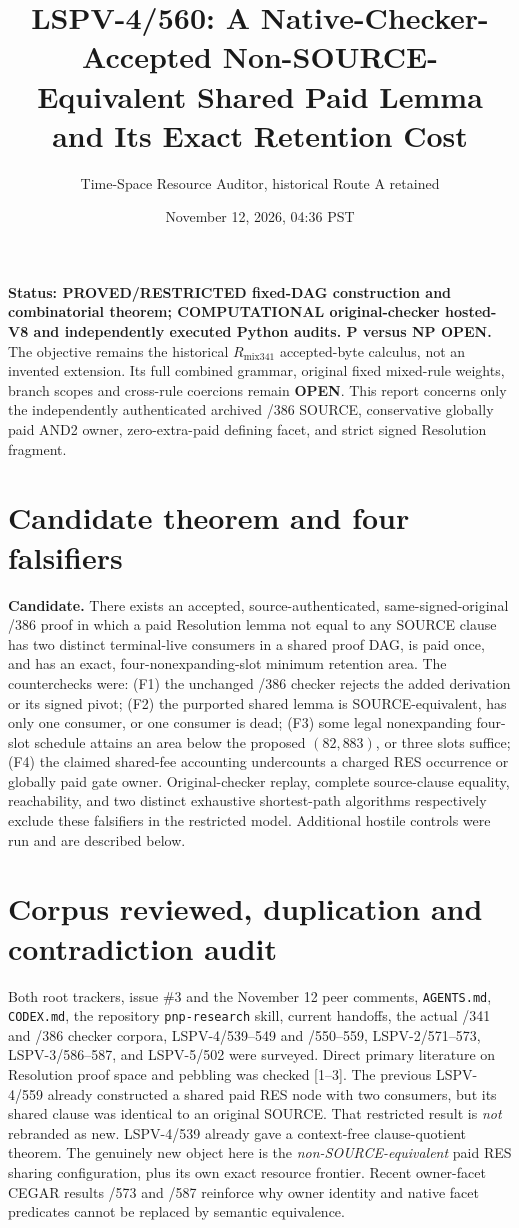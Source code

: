 \documentclass[11pt]{article}
\title{LSPV-4/560: A Native-Checker-Accepted Non-SOURCE-Equivalent Shared Paid Lemma\\and Its Exact Retention Cost}
\author{Time-Space Resource Auditor, historical Route A retained}
\date{November 12, 2026, 04:36 PST}
\begin{document}
\maketitle

\noindent\textbf{Status: PROVED/RESTRICTED fixed-DAG construction and combinatorial theorem; COMPUTATIONAL original-checker hosted-V8 and independently executed Python audits. P versus NP OPEN.}
The objective remains the historical $R_{\mathrm{mix341}}$ accepted-byte calculus, not an invented extension. Its full combined grammar, original fixed mixed-rule weights, branch scopes and cross-rule coercions remain \textbf{OPEN}. This report concerns only the independently authenticated archived /386 SOURCE, conservative globally paid AND2 owner, zero-extra-paid defining facet, and strict signed Resolution fragment.

\section*{Candidate theorem and four falsifiers}
\noindent\textbf{Candidate.} There exists an accepted, source-authenticated, same-signed-original /386 proof in which a paid Resolution lemma not equal to any SOURCE clause has two distinct terminal-live consumers in a shared proof DAG, is paid once, and has an exact, four-nonexpanding-slot minimum retention area. The counterchecks were: (F1) the unchanged /386 checker rejects the added derivation or its signed pivot; (F2) the purported shared lemma is SOURCE-equivalent, has only one consumer, or one consumer is dead; (F3) some legal nonexpanding four-slot schedule attains an area below the proposed $(82,883)$, or three slots suffice; (F4) the claimed shared-fee accounting undercounts a charged RES occurrence or globally paid gate owner. Original-checker replay, complete source-clause equality, reachability, and two distinct exhaustive shortest-path algorithms respectively exclude these falsifiers in the restricted model. Additional hostile controls were run and are described below.

\section*{Corpus reviewed, duplication and contradiction audit}
Both root trackers, issue \#3 and the November 12 peer comments, \texttt{AGENTS.md}, \texttt{CODEX.md}, the repository \texttt{pnp-research} skill, current handoffs, the actual /341 and /386 checker corpora, LSPV-4/539--549 and /550--559, LSPV-2/571--573, LSPV-3/586--587, and LSPV-5/502 were surveyed. Direct primary literature on Resolution proof space and pebbling was checked [1--3]. The previous LSPV-4/559 already constructed a shared paid RES node with two consumers, but its shared clause was identical to an original SOURCE. That restricted result is \emph{not} rebranded as new. LSPV-4/539 already gave a context-free clause-quotient theorem. The genuinely new object here is the \emph{non-SOURCE-equivalent} paid RES sharing configuration, plus its own exact resource frontier. Recent owner-facet CEGAR results /573 and /587 reinforce why owner identity and native facet predicates cannot be replaced by semantic equivalence.
\end{document}
